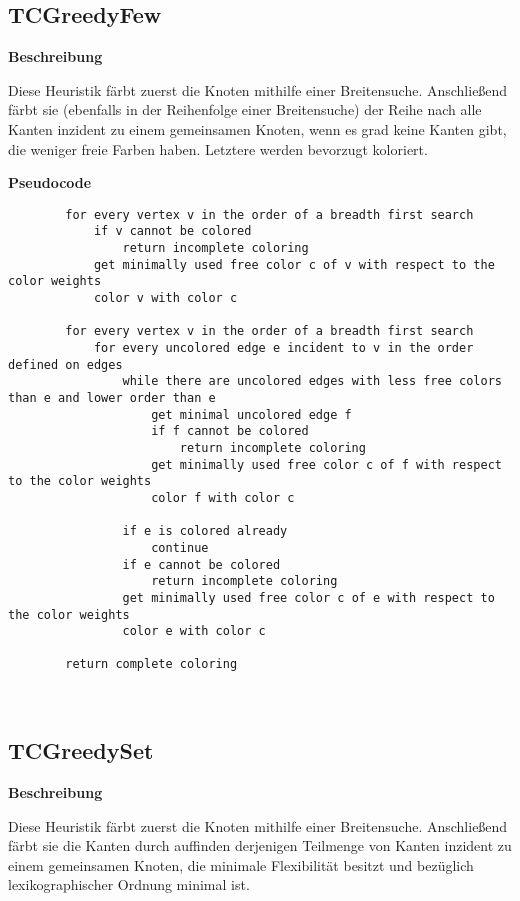 \documentclass{article}
\begin{document}
	\subsection{TCGreedyFew}
	
	\textbf{Beschreibung}
	
	Diese Heuristik färbt zuerst die Knoten mithilfe einer Breitensuche. Anschließend färbt sie (ebenfalls in der Reihenfolge einer Breitensuche) der Reihe nach alle Kanten inzident zu einem gemeinsamen Knoten, wenn es grad keine Kanten gibt, die weniger freie Farben haben. Letztere werden bevorzugt koloriert.
	
	\textbf{Pseudocode}
	\begin{verbatim}
		for every vertex v in the order of a breadth first search
		    if v cannot be colored
		        return incomplete coloring
		    get minimally used free color c of v with respect to the color weights
		    color v with color c
				    
		for every vertex v in the order of a breadth first search
		    for every uncolored edge e incident to v in the order defined on edges
		        while there are uncolored edges with less free colors than e and lower order than e
		            get minimal uncolored edge f
		            if f cannot be colored
		                return incomplete coloring
		            get minimally used free color c of f with respect to the color weights
		            color f with color c
		            
		        if e is colored already
		            continue
		        if e cannot be colored
		            return incomplete coloring
		        get minimally used free color c of e with respect to the color weights
		        color e with color c
				        
		return complete coloring
	\end{verbatim}
	
	~\newpage
	
	\subsection{TCGreedySet}
	
	\textbf{Beschreibung}
	
	Diese Heuristik färbt zuerst die Knoten mithilfe einer Breitensuche. Anschließend färbt sie die Kanten durch auffinden derjenigen Teilmenge von Kanten inzident zu einem gemeinsamen Knoten, die minimale Flexibilität besitzt und bezüglich lexikographischer Ordnung minimal ist.
	
\end{document}

